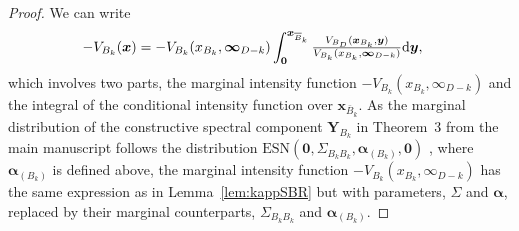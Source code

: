 \documentclass[12pt]{article}
\begin{document}
\begin{proof}
We can write 
\begin{align*}
-V_{B_k}(\bm x) 
&=-V_{B_k}(x_{B_k},\bm\infty_{D-k})\int_{\bm 0}^{\bm x_{{\overline{B}}_k}}{\textstyle{V_{B_D}(\bm x_{B_k},\bm y)\over V_{B_k}(x_{B_k},\bm\infty_{D-k})}} \text d \bm y,
\end{align*}
which involves two parts, the marginal intensity function $-V_{B_k}(x_{B_k},\infty_{D-k})$ and the integral of the conditional intensity function over $\bm x_{\bar B_k}$. As the marginal distribution of the constructive spectral component $\bm Y_{B_k}$ in Theorem~3 from the main manuscript follows the distribution $\text{ESN}(\bm 0,\Sigma_{B_kB_k},\bm\alpha_{(B_k)},\bm 0)$ \citep[Chapter 5.1.4]{Azzalini:2013}, where $\bm\alpha_{(B_k)}$ is defined above, the marginal intensity function $-V_{B_k}(x_{B_k},\infty_{D-k})$ has the same expression as in Lemma~\ref{lem:kappSBR} but with parameters, $\Sigma$ and $\bm\alpha$, replaced by their marginal counterparts, $\Sigma_{B_kB_k}$ and $\bm\alpha_{(B_k)}$. 


\end{proof}
\end{document}
